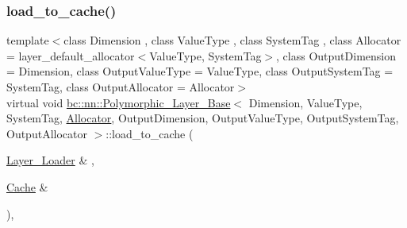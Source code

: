 \mbox{\label{structbc_1_1nn_1_1Polymorphic__Layer__Base_a2e1cbfa3ead765b5eddcdbb617b08ecd}} 
\subsubsection{\texorpdfstring{load\+\_\+to\+\_\+cache()}{load\_to\_cache()}\hspace{0.1cm}{\footnotesize\ttfamily [1/2]}}
{\footnotesize\ttfamily template$<$class Dimension , class Value\+Type , class System\+Tag , class Allocator  = layer\+\_\+default\+\_\+allocator$<$\+Value\+Type, System\+Tag$>$, class Output\+Dimension  = Dimension, class Output\+Value\+Type  = Value\+Type, class Output\+System\+Tag  = System\+Tag, class Output\+Allocator  = Allocator$>$ \\
virtual void \hyperlink{structbc_1_1nn_1_1Polymorphic__Layer__Base}{bc\+::nn\+::\+Polymorphic\+\_\+\+Layer\+\_\+\+Base}$<$ Dimension, Value\+Type, System\+Tag, \hyperlink{classbc_1_1allocators_1_1Allocator}{Allocator}, Output\+Dimension, Output\+Value\+Type, Output\+System\+Tag, Output\+Allocator $>$\+::load\+\_\+to\+\_\+cache (\begin{DoxyParamCaption}\item[{\hyperlink{structbc_1_1nn_1_1Layer__Loader}{Layer\+\_\+\+Loader} \&}]{,  }\item[{\hyperlink{structbc_1_1nn_1_1Cache}{Cache} \&}]{ }\end{DoxyParamCaption})\hspace{0.3cm}{\ttfamily [inline]}, {\ttfamily [virtual]}}

\mbox{\label{structbc_1_1nn_1_1Polymorphic__Layer__Base_a2e1cbfa3ead765b5eddcdbb617b08ecd}} 
